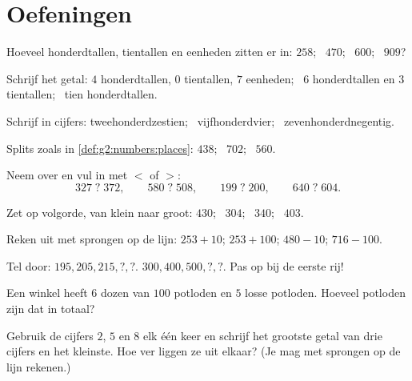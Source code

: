 \section{Oefeningen}

\begin{exercise}[$\star$]\label{exo:g2:numbers:1}
Hoeveel honderdtallen, tientallen en eenheden zitten er in: $258$;
\ $470$; \ $600$; \ $909$?
\end{exercise}

\begin{exercise}[$\star$]\label{exo:g2:numbers:2}
Schrijf het getal: $4$ honderdtallen, $0$ tientallen, $7$ eenheden;
\ $6$ honderdtallen en $3$ tientallen; \ tien honderdtallen.
\end{exercise}

\begin{exercise}[$\star$]\label{exo:g2:numbers:3}
Schrijf in cijfers: tweehonderdzestien; \ vijfhonderdvier;
\ zevenhonderdnegentig.
\end{exercise}

\begin{exercise}[$\star$]\label{exo:g2:numbers:4}
Splits zoals in \cref{def:g2:numbers:places}: $438$; \ $702$; \
$560$.
\end{exercise}

\begin{exercise}[$\star$]\label{exo:g2:numbers:5}
Neem over en vul in met $<$ of $>$:
\[
327 \;?\; 372, \qquad
580 \;?\; 508, \qquad
199 \;?\; 200, \qquad
640 \;?\; 604 .
\]
\end{exercise}

\begin{exercise}[$\star$]\label{exo:g2:numbers:6}
Zet op volgorde, van klein naar groot: $430$; \ $304$; \ $340$; \
$403$.
\end{exercise}

\begin{exercise}[$\star$]\label{exo:g2:numbers:7}
Reken uit met sprongen op de lijn: $253 + 10$; \quad $253 + 100$;
\quad $480 - 10$; \quad $716 - 100$.
\end{exercise}

\begin{exercise}[$\star$]\label{exo:g2:numbers:8}
Tel door: $195, 205, 215, ?, ?$. \quad
$300, 400, 500, ?, ?$. \quad Pas op bij de eerste rij!
\end{exercise}

\begin{exercise}[$\star$]\label{exo:g2:numbers:9}
Een winkel heeft $6$ dozen van $100$ potloden en $5$ losse potloden.
Hoeveel potloden zijn dat in totaal?
\end{exercise}

\begin{exercise}[$\star\star$]\label{exo:g2:numbers:10}
Gebruik de cijfers $2$, $5$ en $8$ elk één keer en schrijf het grootste
getal van drie cijfers en het kleinste. Hoe ver liggen ze uit elkaar?
(Je mag met sprongen op de lijn rekenen.)
\end{exercise}
